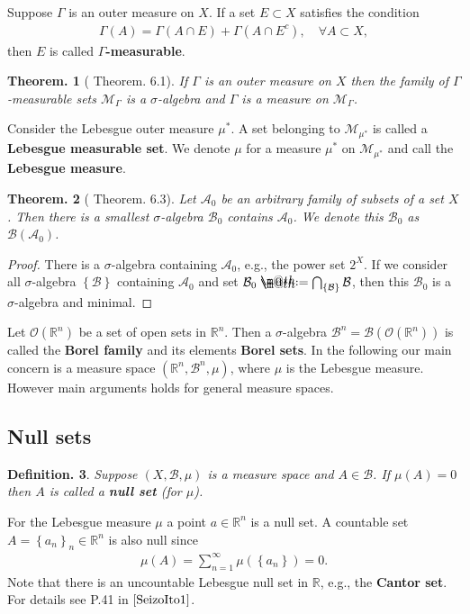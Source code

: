 \documentclass[openany, a4paper, oneside]{jsbook}
\makeatletter
\newcommand*{\defeq}{\mathrel{\rlap{%
\raisebox{0.3ex}{$\m@th\cdot$}}%
\raisebox{-0.3ex}{$\m@th\cdot$}}%
=}
\theoremstyle{break}
\newtheorem{thm}{Theorem.}[section]
\theoremstyle{breakdefn}
\newtheorem{defn}[thm]{Definition.}
\newcommand{\rbk}[1]{\left (#1\right)}
\newcommand{\cbk}[1]{\left\{#1\right\}}
\newcommand{\bbR}{\mathbb{R}}
\newcommand{\bbRn}{\mathbb{R}^n}
\newcommand{\calA}{\mathcal{A}}
\newcommand{\calB}{\mathcal{B}}
\newcommand{\calM}{\mathcal{M}}
\newcommand{\calO}{\mathcal{O}}
\newcommand{\upbf}[1]{\textup{\textbf{#1}}}
\makeatother
\begin{document}
Suppose $\Gamma$ is an outer measure on $X$.
If a set $E \subset X$ satisfies the condition
\begin{align}
 \Gamma (A)
 =
 \Gamma \rbk{A \cap E} + \Gamma \rbk{A \cap E^{c}},
 \quad \forall A \subset X,
\end{align}
then $E$ is called \upbf{$\Gamma$-measurable}.
\begin{thm}[\cite{SeizoIto1} Theorem. 6.1]
 If $\Gamma$ is an outer measure on $X$ then the family of $\Gamma$-measurable sets $\calM_{\Gamma}$ is
 a $\sigma$-algebra and $\Gamma$ is a measure on $\calM_{\Gamma}$.
\end{thm}
Consider the Lebesgue outer measure $\mu^*$.
A set belonging to $\calM_{\mu^*}$ is called a \textbf{Lebesgue measurable set}.
We denote $\mu$ for a measure $\mu^*$ on $\calM_{\mu^*}$ and call the \textbf{Lebesgue measure}.
\begin{thm}[\cite{SeizoIto1} Theorem. 6.3]
 Let $\calA_0$ be an arbitrary family of subsets of a set $X$.
 Then there is a smallest $\sigma$-algebra $\calB_0$ contains $\calA_0$.
 We denote this $\calB_0$ as $\calB (\calA_0)$.
\end{thm}
\begin{proof}
There is a $\sigma$-algebra containing $\calA_0$, e.g., the power set $2^X$.
If we consider all $\sigma$-algebra $\cbk{\calB}$ containing $\calA_0$ and
set $\calB_0 \defeq \bigcap_{\cbk{\calB}} \calB$,
then this $\calB_0$ is a $\sigma$-algebra and minimal.
\end{proof}

Let $\calO (\bbRn)$ be a set of open sets in $\bbRn$.
Then a $\sigma$-algebra $\calB^n = \calB (\calO (\bbRn))$ is called the \upbf{Borel family}
and its elements \upbf{Borel sets}.
In the following our main concern is a measure space $(\bbRn, \calB^n, \mu)$,
where $\mu$ is the Lebesgue measure.
However main arguments holds for general measure spaces.
\subsection{Null sets}


\begin{defn}
 Suppose $(X, \calB, \mu)$ is a measure space and $A \in \calB$.
 If $\mu (A) = 0$ then $A$ is called a \upbf{null set} (for $\mu$).
\end{defn}
For the Lebesgue measure $\mu$ a point $a \in \bbRn$ is a null set.
A countable set $A = \cbk{a_n}_n \in \bbRn$ is also null since
\begin{align}
 \mu (A)
 =
 \sum_{n=1}^{\infty} \mu \rbk{\cbk{a_n}}
 = 0.
\end{align}
Note that there is an uncountable Lebesgue null set in $\bbR$, e.g., the \textbf{Cantor set}.
For details see P.41 in $\cite{SeizoIto1}$.
\end{document}
